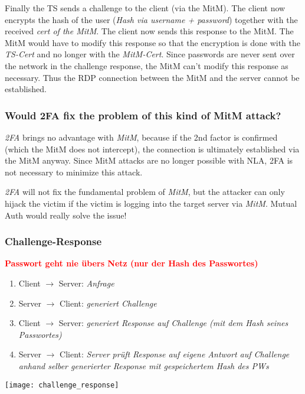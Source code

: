 Finally the TS sends a challenge to the client (via the MitM). The client now encrypts the hash of the user (\textit{Hash via username + password}) together with the received \textit{cert of the MitM}. The client now sends this response to the MitM. The MitM would have to modify this response so that the encryption is done with the \textit{TS-Cert} and no longer with the \textit{MitM-Cert}. Since passwords are never sent over the network in the challenge response, the MitM can't modify this response as necessary.
Thus the RDP connection between the MitM and the server cannot be established.

\newpage

\subsubsection{Would 2FA fix the problem of this kind of MitM attack?}
\textit{2FA} brings no advantage with \textit{MitM}, because if the 2nd factor is confirmed (which the MitM does not intercept), the connection is ultimately established via the MitM anyway.
Since MitM attacks are no longer possible with NLA, 2FA is not necessary to minimize this attack.

\textit{2FA} will not fix the fundamental problem of \textit{MitM}, but the attacker can only hijack the victim if the victim is logging into the target server via \textit{MitM}. Mutual Auth would really solve the issue!

\subsubsection{Challenge-Response}
\textcolor{red}{\textbf{Passwort geht nie übers Netz (nur der Hash des Passwortes)}}\\

\begin{minipage}{0.45\linewidth}
    \begin{enumerate}
        \item Client $\rightarrow$ Server: \textit{Anfrage}
        \item Server $\rightarrow$ Client: \textit{generiert Challenge}
        \item Client $\rightarrow$ Server: \textit{generiert Response auf Challenge (mit dem Hash seines Passwortes)}
        \item Server $\rightarrow$ Client: \textit{Server prüft Response auf eigene Antwort auf Challenge anhand selber generierter Response mit gespeichertem Hash des PWs}
    \end{enumerate}
\end{minipage}
\begin{minipage}{0.5\linewidth}
    \begin{center}
        \texttt{[image: challenge\_response]}
        \vspace{-8pt}
    \end{center}
\end{minipage}

